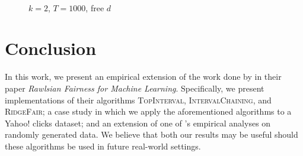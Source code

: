 \documentclass[11pt]{article}
\begin{document}
\begin{figure}[ht!]
{	}
	\\
	\caption{$k=2$, $T=1000$, free $d$}
	\label{fig:free_d}
\end{figure}

\section{Conclusion}

In this work, we present an empirical extension of the work done by  in their paper \textit{Rawlsian Fairness for Machine Learning}. Specifically, we present implementations of their algorithms \textsc{TopInterval}, \textsc{IntervalChaining}, and \textsc{RidgeFair}; a case study in which we apply the aforementioned algorithms to a Yahoo! clicks dataset; and an extension of one of 's empirical analyses on randomly generated data. We believe that both our results may be useful should these algorithms be used in future real-world settings. 



\end{document}
